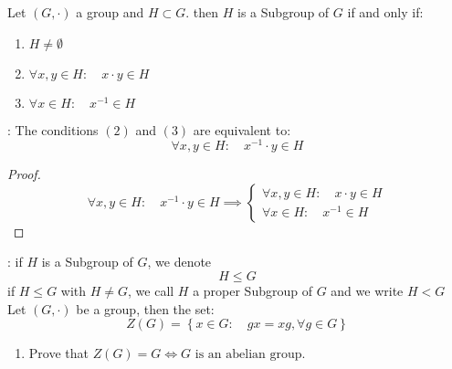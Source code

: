 \begin{proposition}
  
  Let $(G, \cdot )  $  a group and $H \subset G $. then $H $ is a Subgroup of $G $ if and only if:
  \begin{enumerate}
  \item $H \neq \emptyset  $ 
    \item $ \forall x,y \in  H: \quad x \cdot  y \in  H $  
      \item $\forall x \in  H: \quad x^{-1} \in  H $  
  \end{enumerate}
\end{proposition}
\underline{}: The conditions $(2)  $  and $(3)  $ are equivalent to:
\[
\forall x,y \in H: \quad x^{-1} \cdot  y \in  H 
\]
\begin{proof}
\[
\forall x,y \in H: \quad x^{-1}\cdot y \in  H \implies 
\begin{cases}
\forall x,y \in  H: \quad x \cdot  y \in  H \\
\forall x \in  H: \quad x^{-1} \in  H
\end{cases}
\]
\end{proof}
\underline{}: if $H $ is a Subgroup of $G $, 
we denote 
\[
H \leq G
\]
if $H \leq  G$ with $H \neq G $, we call $H $ a proper Subgroup of $G $ and we write $H < G$   \\
\exercise
Let $(G, \cdot )  $ be a group, then the set:
\[
Z(G) = \left\{ x \in  G: \quad  gx = xg , \forall g \in  G \right\} 
\]
\begin{enumerate}
  \item Prove that $Z(G) = G\iff G \text{ is an abelian group.} $ 
\end{enumerate}
